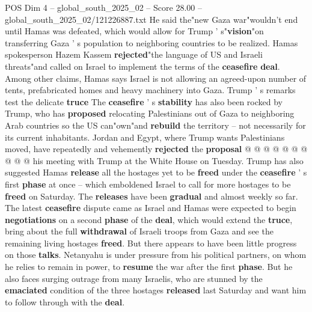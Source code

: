 \begin{textsample}{POS Dim 4 – global\_south\_2025\_02 – Score 28.00 – global\_south\_2025\_02/121226887.txt}
He said the"new Gaza war"wouldn't end until Hamas was defeated, which would allow for Trump ' s"\textbf{vision}"on transferring Gaza ' s population to neighboring countries to be realized.
Hamas spokesperson Hazem Kassem \textbf{rejected}"the language of US and Israeli threats"and called on Israel to implement the terms of the \textbf{ceasefire} \textbf{deal}.
Among other claims, Hamas says Israel is not allowing an agreed-upon number of tents, prefabricated homes and heavy machinery into Gaza.
Trump ' s remarks test the delicate \textbf{truce} The \textbf{ceasefire} ' s \textbf{stability} has also been rocked by Trump, who has \textbf{proposed} relocating Palestinians out of Gaza to neighboring Arab countries so the US can"own"and \textbf{rebuild} the territory -- not necessarily for its current inhabitants.
Jordan and Egypt, where Trump wants Palestinians moved, have repeatedly and vehemently \textbf{rejected} the \textbf{proposal} @ @ @ @ @ @ @ @ @ @ his meeting with Trump at the White House on Tuesday.
Trump has also suggested Hamas \textbf{release} all the hostages yet to be \textbf{freed} under the \textbf{ceasefire} ' s first \textbf{phase} at once -- which emboldened Israel to call for more hostages to be \textbf{freed} on Saturday.
The \textbf{releases} have been \textbf{gradual} and almost weekly so far.
The latest \textbf{ceasefire} dispute came as Israel and Hamas were expected to begin \textbf{negotiations} on a second \textbf{phase} of the \textbf{deal}, which would extend the \textbf{truce}, bring about the full \textbf{withdrawal} of Israeli troops from Gaza and see the remaining living hostages \textbf{freed}.
But there appears to have been little progress on those \textbf{talks}.
Netanyahu is under pressure from his political partners, on whom he relies to remain in power, to \textbf{resume} the war after the first \textbf{phase}.
But he also faces surging outrage from many Israelis, who are stunned by the \textbf{emaciated} condition of the three hostages \textbf{released} last Saturday and want him to follow through with the \textbf{deal}.

\end{textsample}
